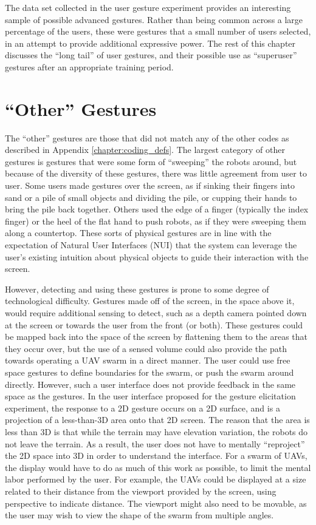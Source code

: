 The data set collected in the user gesture experiment provides an interesting sample of possible advanced gestures. 
Rather than being common across a large percentage of the users, these were gestures that a small number of users selected, in an attempt to provide additional expressive power. 
The rest of this chapter discusses the ``long tail'' of user gestures, and their possible use as ``superuser'' gestures after an appropriate training period. 

\section{``Other'' Gestures}

The ``other'' gestures are those that did not match any of the other codes as described in Appendix \ref{chapter:coding_defs}. 
The largest category of other gestures is gestures that were some form of ``sweeping'' the robots around, but because of the diversity of these gestures, there was little agreement from user to user. 
Some users made gestures over the screen, as if sinking their fingers into sand or a pile of small objects and dividing the pile, or cupping their hands to bring the pile back together. 
Others used the edge of a finger (typically the index finger) or the heel of the flat hand to push robots, as if they were sweeping them along a countertop. 
These sorts of physical gestures are in line with the expectation of Natural User Interfaces (NUI) that the system can leverage the user's existing intuition about physical objects to guide their interaction with the screen. 

However, detecting and using these gestures is prone to some degree of technological difficulty. 
Gestures made off of the screen, in the space above it, would require additional sensing to detect, such as a depth camera pointed down at the screen or towards the user from the front (or both). 
These gestures could be mapped back into the space of the screen by flattening them to the areas that they occur over, but the use of a sensed volume could also provide the path towards operating a UAV swarm in a direct manner. 
The user could use free space gestures to define boundaries for the swarm, or push the swarm around directly. 
However, such a user interface does not provide feedback in the same space as the gestures. 
In the user interface proposed for the gesture elicitation experiment, the response to a 2D gesture occurs on a 2D surface, and is a projection of a less-than-3D area onto that 2D screen.
The reason that the area is less than 3D is that while the terrain may have elevation variation, the robots do not leave the terrain. 
As a result, the user does not have to mentally ``reproject'' the 2D space into 3D in order to understand the interface. 
For a swarm of UAVs, the display would have to do as much of this work as possible, to limit the mental labor performed by the user. 
For example, the UAVs could be displayed at a size related to their distance from the viewport provided by the screen, using perspective to indicate distance. 
The viewport might also need to be movable, as the user may wish to view the shape of the swarm from multiple angles. 


